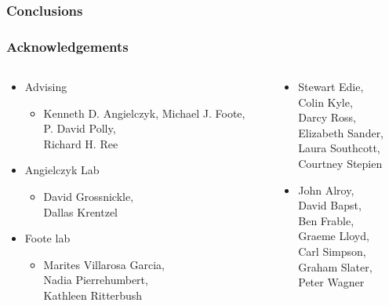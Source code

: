 \documentclass{beamer}
\begin{document}
\begin{frame}
  \frametitle{Conclusions}
\end{frame}

\begin{frame}
  \frametitle{Acknowledgements}
  \begin{columns}
    \begin{column}{0.5\textwidth}
      \begin{itemize}
        \item Advising
          \begin{itemize}
            \item Kenneth D. Angielczyk, Michael J. Foote, \\P. David Polly, \\Richard H. Ree
          \end{itemize}
        \item Angielczyk Lab
          \begin{itemize}
            \item {\small{David Grossnickle, \\Dallas Krentzel}}
          \end{itemize}
        \item Foote lab
          \begin{itemize}
            \item {\small{Marites Villarosa Garcia, \\Nadia Pierrehumbert, \\Kathleen Ritterbush}}
          \end{itemize}
      \end{itemize}
    \end{column}
    \begin{column}{0.5\textwidth}
      \begin{itemize}
        \item {\footnotesize{Stewart Edie, \\Colin Kyle, \\Darcy Ross, \\Elizabeth Sander, \\Laura Southcott, \\Courtney Stepien}}
        \item {\footnotesize{John Alroy, \\David Bapst, \\Ben Frable, \\Graeme Lloyd, \\Carl Simpson, \\Graham Slater, \\Peter Wagner}}
      \end{itemize}
    \end{column}
  \end{columns}
\end{frame}
\end{document}

